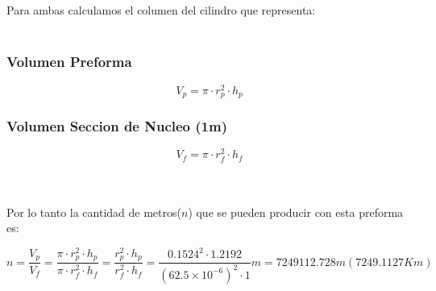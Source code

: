 \\{ }\\
Para ambas calculamos el columen del cilindro que representa:
\\{ }\\
\begin{minipage}[t]{.5\textwidth}
\raggedright
\subsubsection*{Volumen Preforma}
$$
V_p = \pi \cdot r_p^2 \cdot h_p
$$
\end{minipage}%
\begin{minipage}[t]{.5\textwidth}
\raggedright
\subsubsection*{Volumen Seccion de Nucleo (1m)}
$$
V_f = \pi \cdot r_f^2 \cdot h_f
$$
\end{minipage}%
\\{ }\\
Por lo tanto la cantidad de metros($n$) que se pueden producir con esta preforma es:

$$
	n = \dfrac{V_p}{V_f} = \dfrac{\pi \cdot r_p^2 \cdot h_p}{\pi \cdot r_f^2 \cdot h_f} = \dfrac{r_p^2 \cdot h_p}{r_f^2 \cdot h_f} = \dfrac{0.1524^2 \cdot 1.2192}{(62.5\times 10^{-6})^2 \cdot 1} m = 7249112.728 m (7249.1127Km)
$$